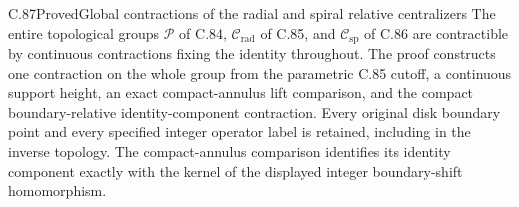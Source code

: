 \begin{claim}{C.87}{Proved}{Global contractions of the radial and spiral relative centralizers}
The entire topological groups $\mathscr P$ of
C.84, $\mathscr C_{\mathrm{rad}}$ of C.85,
and $\mathscr C_{\mathrm{sp}}$ of C.86
are contractible by continuous contractions
fixing the identity throughout.
The proof constructs one contraction on
the whole group from the parametric C.85
cutoff, a continuous support height, an
exact compact-annulus lift comparison,
and the compact boundary-relative
identity-component contraction.
Every original disk boundary point and
every specified integer operator label
is retained, including in the inverse
topology. The compact-annulus comparison
identifies its identity component exactly
with the kernel of the displayed integer
boundary-shift homomorphism.
\end{claim}

